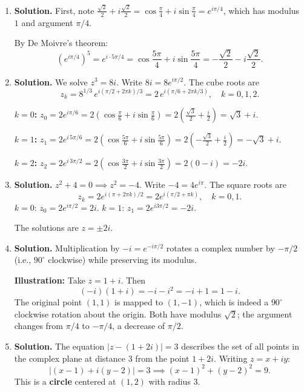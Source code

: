 \begin{enumerate}
\item \textbf{Solution.}
First, note $\frac{\sqrt{2}}{2} + i\frac{\sqrt{2}}{2} = \cos\frac{\pi}{4} + i\sin\frac{\pi}{4} = e^{i\pi/4}$, which has modulus $1$ and argument $\pi/4$.

By De Moivre's theorem:
\[
\left(e^{i\pi/4}\right)^5 = e^{i \cdot 5\pi/4} = \cos\frac{5\pi}{4} + i\sin\frac{5\pi}{4} = -\frac{\sqrt{2}}{2} - i\frac{\sqrt{2}}{2}.
\]

\item \textbf{Solution.}
We solve $z^3 = 8i$. Write $8i = 8e^{i\pi/2}$. The cube roots are
\[
z_k = 8^{1/3}\, e^{i(\pi/2 + 2\pi k)/3} = 2\,e^{i(\pi/6 + 2\pi k/3)}, \quad k = 0, 1, 2.
\]

\textbf{$k=0$:} $z_0 = 2e^{i\pi/6} = 2\left(\cos\frac{\pi}{6} + i\sin\frac{\pi}{6}\right) = 2\left(\frac{\sqrt{3}}{2} + \frac{i}{2}\right) = \sqrt{3} + i.$

\textbf{$k=1$:} $z_1 = 2e^{i\,5\pi/6} = 2\left(\cos\frac{5\pi}{6} + i\sin\frac{5\pi}{6}\right) = 2\left(-\frac{\sqrt{3}}{2} + \frac{i}{2}\right) = -\sqrt{3} + i.$

\textbf{$k=2$:} $z_2 = 2e^{i\,3\pi/2} = 2\left(\cos\frac{3\pi}{2} + i\sin\frac{3\pi}{2}\right) = 2(0 - i) = -2i.$

\item \textbf{Solution.}
$z^2 + 4 = 0 \implies z^2 = -4$. Write $-4 = 4e^{i\pi}$. The square roots are
\[
z_k = 2e^{i(\pi + 2\pi k)/2} = 2e^{i(\pi/2 + \pi k)}, \quad k = 0, 1.
\]
$k=0$: $z_0 = 2e^{i\pi/2} = 2i$. \quad $k=1$: $z_1 = 2e^{i3\pi/2} = -2i$.

The solutions are $z = \pm 2i$.

\item \textbf{Solution.}
Multiplication by $-i = e^{-i\pi/2}$ rotates a complex number by $-\pi/2$ (i.e., $90^\circ$ clockwise) while preserving its modulus.

\textbf{Illustration:} Take $z = 1 + i$. Then
\[
(-i)(1 + i) = -i - i^2 = -i + 1 = 1 - i.
\]
The original point $(1,1)$ is mapped to $(1,-1)$, which is indeed a $90^\circ$ clockwise rotation about the origin. Both have modulus $\sqrt{2}$; the argument changes from $\pi/4$ to $-\pi/4$, a decrease of $\pi/2$.

\item \textbf{Solution.}
The equation $|z - (1 + 2i)| = 3$ describes the set of all points in the complex plane at distance $3$ from the point $1 + 2i$. Writing $z = x + iy$:
\[
|(x - 1) + i(y - 2)| = 3 \implies (x-1)^2 + (y-2)^2 = 9.
\]
This is a \textbf{circle} centered at $(1, 2)$ with radius $3$.


\end{enumerate}
